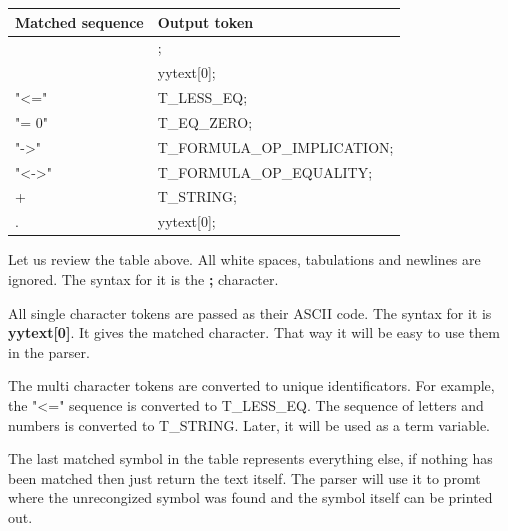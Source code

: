 \documentclass{article}
\begin{document}
		\begin{flushleft}
			\centering
			\begin{tabular}{ | m{10em} | m{15em}| } 
				\hline
					\textbf{Matched sequence} & \textbf{Output token} \\ [0.7ex] 
				\hline
					[ \textbackslash t\textbackslash  n] & ; \\
				\hline
					[,TF01()C\&|~*+-] 	& yytext[0];  \\
				\hline
				    "<="            &   T\_LESS\_EQ; \\
				\hline
				    "= 0"           &   T\_EQ\_ZERO; \\
				\hline
				    "->"            &   T\_FORMULA\_OP\_IMPLICATION; \\
				\hline
				    "<->"           &   T\_FORMULA\_OP\_EQUALITY; \\
				\hline
				    [a-zA-Z0-9]+    &   T\_STRING; \\
				\hline
				    .               &   yytext[0]; \\
				\hline
			\end{tabular}
		\end{flushleft}
	Let us review the table above. All white spaces, tabulations and newlines are ignored. The syntax for it is the \textbf{;} character.

	All single character tokens are passed as their ASCII code. The syntax for it is \textbf{yytext[0]}. It gives the matched character. That way it will be easy to use them in the parser.

	The multi character tokens are converted to unique identificators. For example, the "<=" sequence is converted to T\_LESS\_EQ. The sequence of letters and numbers is converted to T\_STRING. Later, it will be used as a term variable.

	The last matched symbol in the table represents everything else, if nothing has been matched then just return the text itself.
	The parser will use it to promt where the unrecongized symbol was found and the symbol itself can be printed out.

\end{document}
